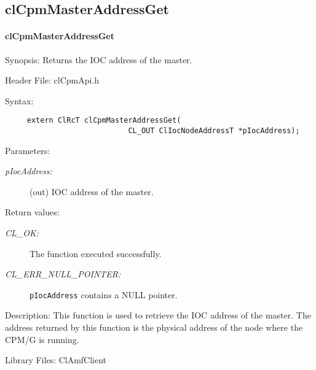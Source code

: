 {\subsection{clCpmMasterAddressGet}
\hypertarget{pagecpm135}{}\paragraph{cl\-Cpm\-Master\-Address\-Get}\label{pagecpm135}
\begin{Desc}
\item[Synopsis:]Returns the IOC address of the master.\end{Desc}
\begin{Desc}
\item[Header File:]clCpmApi.h\end{Desc}
\begin{Desc}
\item[Syntax:]

\footnotesize\begin{verbatim}     extern ClRcT clCpmMasterAddressGet(
                			CL_OUT ClIocNodeAddressT *pIocAddress);
\end{verbatim}
\normalsize
\end{Desc}
\begin{Desc}
\item[Parameters:]
\begin{description}
\item[{\em p\-Ioc\-Address:}](out) IOC address of the master.\end{description}
\end{Desc}
\begin{Desc}
\item[Return values:]
\begin{description}
\item[{\em CL\_\-OK:}]The function executed successfully. \item[{\em CL\_\-ERR\_\-NULL\_\-POINTER:}]{\tt{pIocAddress}} contains a NULL pointer.\end{description}
\end{Desc}
\begin{Desc}
\item[Description:]This function is used to retrieve the IOC address of the master. The address returned by this function is the physical address of the
node where the CPM/G is running.\end{Desc}
\begin{Desc}
\item[Library Files:]Cl\-Amf\-Client\end{Desc}

}
